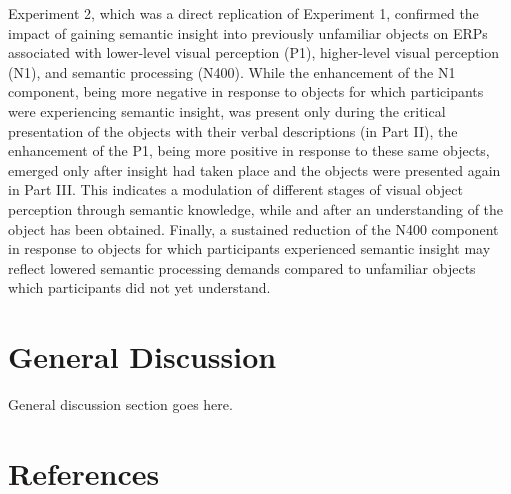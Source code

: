 \documentclass[
  english,
  man,11pt,floatsintext]{apa7}
\begin{document}
Experiment 2, which was a direct replication of Experiment 1, confirmed the impact of gaining semantic insight into previously unfamiliar objects on ERPs associated with lower-level visual perception (P1), higher-level visual perception (N1), and semantic processing (N400). While the enhancement of the N1 component, being more negative in response to objects for which participants were experiencing semantic insight, was present only during the critical presentation of the objects with their verbal descriptions (in Part II), the enhancement of the P1, being more positive in response to these same objects, emerged only after insight had taken place and the objects were presented again in Part III. This indicates a modulation of different stages of visual object perception through semantic knowledge, while and after an understanding of the object has been obtained. Finally, a sustained reduction of the N400 component in response to objects for which participants experienced semantic insight may reflect lowered semantic processing demands compared to unfamiliar objects which participants did not yet understand.

\hypertarget{general-discussion}{%
\section{General Discussion}\label{general-discussion}}

General discussion section goes here.

\newpage

\hypertarget{references}{%
\section{References}\label{references}}

\setlength{\parindent}{-0.5in}
\end{document}
